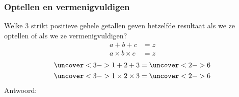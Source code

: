 \documentclass[13pt]{beamer}
\begin{document}
\newcommand{\koffer}[2]{
  \begin{tikzpicture}[scale=0.9,line cap=round,line join=round,>=triangle 45,x=1.0cm,y=1.0cm]
    \clip(-0.1,-0.5) rectangle (3.6,2.);
    \draw [line width=1.6pt] (0.,0.)-- (2.5,0.);
    \draw [line width=1.6pt] (2.5,0.)-- (3.5,0.5);
    \draw [line width=1.6pt] (2.5,0.)-- (2.5,1.);
    \draw [line width=1.6pt] (2.5,1.)-- (3.5,1.5);
    \draw [line width=1.6pt] (3.5,1.5)-- (3.5,0.5);
    \draw [line width=1.6pt] (2.5,1.)-- (0.,1.);
    \draw [line width=1.6pt] (0.,1.)-- (0.,0.);
    \draw [shift={(3.15,0.94)},line width=1.6pt]
    plot[domain=1.01:3.06,variable=\t]
    ({1.*0.66*cos(\t r)+0.*0.66*sin(\t r)},{0.*0.66*cos(\t r)+1.*0.66*sin(\t r)});
    \draw [line width=2.pt] (0.60,1.60)-- (3.10,1.60);
    \draw [shift={(0.65,0.94)},line width=1.6pt]
    plot[domain=1.65:3.06,variable=\t]
    ({1.*0.66*cos(\t r)+0.*0.66*sin(\t r)},{0.*0.66*cos(\t r)+1.*0.66*sin(\t r)});
    \draw (2.7,1) node[anchor=north west] {\bf#1};
    \draw (-.1,1) node[anchor=north west] {\scriptsize\begin{tabular}{c}#2\end{tabular}};
  \end{tikzpicture}
}

\begin{frame}
  \frametitle{Optellen en vermenigvuldigen}
  Welke 3 strikt positieve gehele getallen geven hetzelfde resultaat als we ze optellen of als we ze vermenigvuldigen?
  \vfill
  \begin{align*}
    a + b + c &= z\\
    a \times b \times c &= z
  \end{align*}
  \begin{align*}
    \uncover<3->{1 + 2 + 3} &= \uncover<2->{6}\\
    \uncover<3->{1 \times 2 \times 3} &= \uncover<2->{6}
  \end{align*}
  \vfill
  Antwoord: 
\end{frame}
\end{document}
